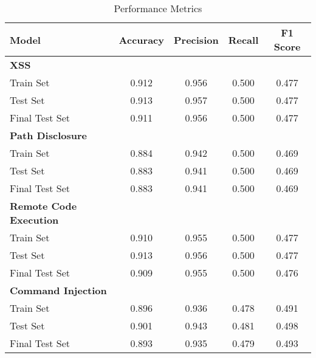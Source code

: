\begin{table}[htbp]
    \centering
    \caption{Performance Metrics}
    \label{tab:performance}
    \begin{tabular}{lcccc}
        \toprule
        Model & Accuracy & Precision & Recall & F1 Score \\
        \midrule
        \textbf{XSS} \\
        Train Set & 0.912 & 0.956 & 0.500 & 0.477 \\
        Test Set & 0.913 & 0.957 & 0.500 & 0.477 \\
        Final Test Set & 0.911 & 0.956 & 0.500 & 0.477 \\
        \midrule
        \textbf{Path Disclosure} \\
        Train Set & 0.884 & 0.942 & 0.500 & 0.469 \\
        Test Set & 0.883 & 0.941 & 0.500 & 0.469 \\
        Final Test Set & 0.883 & 0.941 & 0.500 & 0.469 \\
        \midrule
        \textbf{Remote Code Execution} \\
        Train Set & 0.910 & 0.955 & 0.500 & 0.477 \\
        Test Set & 0.913 & 0.956 & 0.500 & 0.477 \\
        Final Test Set & 0.909 & 0.955 & 0.500 & 0.476 \\
        \midrule
        \textbf{Command Injection} \\
        Train Set & 0.896 & 0.936 & 0.478 & 0.491 \\
        Test Set & 0.901 & 0.943 & 0.481 & 0.498 \\
        Final Test Set & 0.893 & 0.935 & 0.479 & 0.493 \\
        \bottomrule
    \end{tabular}
\end{table}

